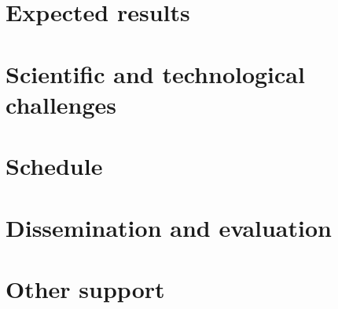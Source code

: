 \documentclass[onecolumn,a4paper,11pt]{article}
\begin{document}
\lipsum[1-5]



\section{Expected results}

\lipsum[1-5]





\section{Scientific and technological challenges}

\lipsum[1-5]


\section{Schedule}


\lipsum[1-5]


\section{Dissemination and evaluation}


\lipsum[1-5]


\section{Other support}



\lipsum[1-5]





\end{document}
